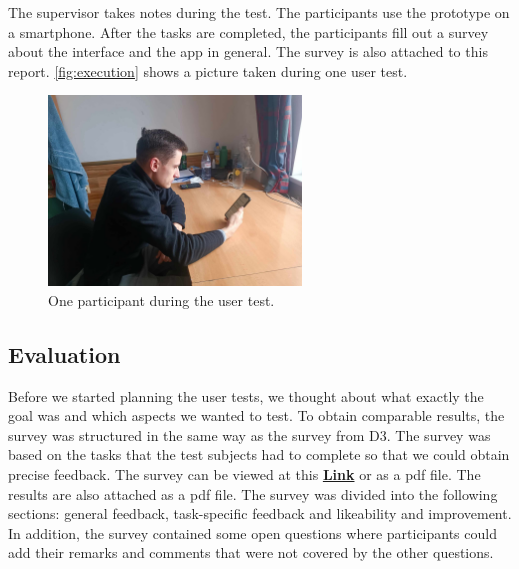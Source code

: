 \documentclass[11pt]{article}
\begin{document}
The supervisor takes notes during the test. The participants use the prototype on a smartphone. After the tasks are completed, the participants fill out a survey about the interface and the app in general. The survey is also attached to this report. \autoref{fig:execution} shows a picture taken during one user test.
\begin{figure}[h!]
    \centering
    \includegraphics[width = 0.6\textwidth]{figures/Kostas_2.png}
    \caption{One participant during the user test.}
    \label{fig:execution}
\end{figure}




\subsection{Evaluation}
Before we started planning the user tests, we thought about what exactly the goal was and which aspects we wanted to test. To obtain comparable results, the survey was structured in the same way as the survey from D3. The survey was based on the tasks that the test subjects had to complete so that we could obtain precise feedback. The survey can be viewed at this \href{https://docs.google.com/forms/d/1XZn5U9J93oJQlkRKYR0nUfQ5ODQfRJeZ9GHHDy1MJC8/edit}{\textbf{Link}} or as a pdf file. The results are also attached as a pdf file. The survey was divided into the following sections: general feedback, task-specific feedback and likeability and improvement. In addition, the survey contained some open questions where participants could add their remarks and comments that were not covered by the other questions.
\end{document}
